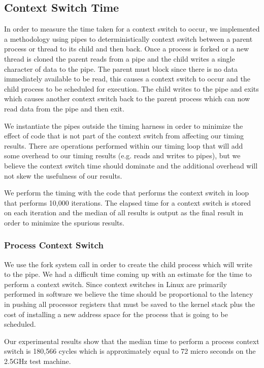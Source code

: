 \subsection{Context Switch Time} 

In order to measure the time taken for a context switch to occur, we implemented
a methodology using pipes to deterministically context switch between a parent
process or thread to its child and then back. Once a process is forked or a new
thread is cloned the parent reads from a pipe and the child writes a single
character of data to the pipe. The parent must block since there is no data
immediately available to be read, this causes a context switch to occur and the
child process to be scheduled for execution. The child writes to the pipe and
exits which causes another context switch back to the parent process which can
now read data from the pipe and then exit. 

We instantiate the pipes outside the timing harness in order to minimize the effect
of code that is not part of the context switch from affecting our timing
results. There are operations performed within our timing loop that will add
some overhead to our timing results (e.g. reads and writes to pipes), but we
believe the context switch time should dominate and the additional overhead will
not skew the usefulness of our results.

We perform the timing with the code that performs the context switch in loop
that performs 10,000 iterations. The elapsed time for a context switch is stored
on each iteration and the median of all results is output as the final result in
order to minimize the spurious results.

\subsubsection{Process Context Switch} 
We use the fork system call in order to create the child process which will
write to the pipe. We had a difficult time coming up with an estimate for the
time to perform a context switch. Since context switches in Linux are primarily
performed in software we believe the time should be proportional to the latency
in pushing all processor registers that must be saved to the kernel stack plus
the cost of installing a new address space for the process that is going to be
scheduled.

Our experimental results show that the median time to perform a process context
switch is 180,566 cycles which is approximately equal to 72 micro seconds on the
2.5GHz test machine. 

